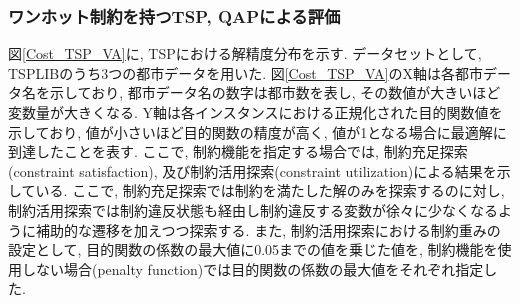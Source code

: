 \documentclass[submit,techrep,noauthor]{ipsj}
\begin{document}



\subsubsection{ワンホット制約を持つTSP, QAPによる評価}
図\ref{Cost_TSP_VA}に, TSPにおける解精度分布を示す. データセットとして, TSPLIB\cite{tsplib}のうち3つの都市データを用いた. 図\ref{Cost_TSP_VA}のX軸は各都市データ名を示しており, 都市データ名の数字は都市数を表し, その数値が大きいほど変数量が大きくなる. Y軸は各インスタンスにおける正規化された目的関数値を示しており, 値が小さいほど目的関数の精度が高く, 値が1となる場合に最適解に到達したことを表す. ここで, 制約機能を指定する場合では, 制約充足探索(constraint satisfaction), 及び制約活用探索(constraint utilization)による結果を示している. ここで, 制約充足探索では制約を満たした解のみを探索するのに対し, 制約活用探索では制約違反状態も経由し制約違反する変数が徐々に少なくなるように補助的な遷移を加えつつ探索する. また, 制約活用探索における制約重みの設定として, 目的関数の係数の最大値に0.05までの値を乗じた値を, 制約機能を使用しない場合(penalty function)では目的関数の係数の最大値をそれぞれ指定した.
\end{document}
